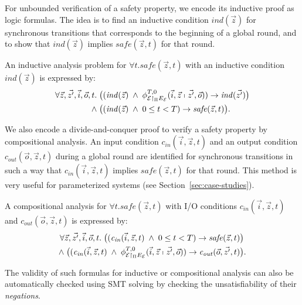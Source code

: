 For unbounded verification of a safety property,
we encode its inductive proof as logic formulas.
The idea is to find an inductive condition $\mathit{ind}(\vec{z})$ 
for synchronous transitions
that corresponds to the beginning of a global round,
and to show that $\mathit{ind}(\vec{z})$ implies %
$\mathit{safe}(\vec{z},t)$ 
for that round.

\begin{definition} 
An inductive analysis problem for $\forall t.  \mathit{safe}(\vec{z},t)$
with an inductive condition $\mathit{ind}(\vec{z})$ is expressed by:
\begin{align*}
\forall \vec{z}, \vec{z'}, \vec{i}, \vec{o}, t.\;&
\big(
(\mathit{ind}(\vec{z})\;\wedge\;\phi_{\mathcal{E} \restriction_{\Pi} E_\mathcal{E}}^{T,0}(\vec{i}, \vec{z}\shortmid \vec{z'}, \vec{o}))
\rightarrow
\mathit{ind}(\vec{z'})\big)
\\
\wedge\;
&
\big((\mathit{ind}(\vec{z}) \;\wedge\;   0 \leq t < T )  \rightarrow \mathit{safe}(\vec{z},t)\big).
\end{align*}
\end{definition}

We also encode a divide-and-conquer proof
to verify a safety property by compositional analysis. %
An input condition $\mathit{c}_\mathit{in}(\vec{i},\vec{z},t)$
and an output condition $\mathit{c}_\mathit{out}(\vec{o},\vec{z},t)$ 
during a global round
are identified for synchronous transitions
in such a way 
that $\mathit{c}_\mathit{in}(\vec{i},\vec{z},t)$ implies %
$\mathit{safe}(\vec{z},t)$ for that round.
This method is very useful for parameterized systems (see Section~\ref{sec:case-studies}).


\begin{definition} A compositional analysis for $\forall t.  \mathit{safe}(\vec{z},t)$
with I/O conditions $\mathit{c}_\mathit{in}(\vec{i},\vec{z},t)$ and $\mathit{c}_\mathit{out}(\vec{o},\vec{z},t)$
is expressed by:
\begin{align*}
\forall \vec{z}, \vec{z'}, \vec{i}, \vec{o}, t.\;
\big((\mathit{c}_\mathit{in}(\vec{i},\vec{z},t)  \;\wedge\;   0 \leq t < T) \rightarrow \mathit{safe}(\vec{z},t) \big)
\phantom{.}
\\
\wedge\;
\big(
(\mathit{c}_\mathit{in}(\vec{i},\vec{z},t)
\;\wedge\;
\phi_{\mathcal{E} \restriction_{\Pi} E_\mathcal{E}}^{T,0}(
	\vec{i}, \vec{z}
	\shortmid 
	\vec{z'}, \vec{o})
)
\rightarrow
\mathit{c}_\mathit{out}(\vec{o},\vec{z'},t)\big).
\end{align*}
\end{definition}

The validity of such formulas for inductive or compositional  analysis can also be automatically checked 
using SMT solving
by checking the unsatisfiability of their \emph{negations}.









